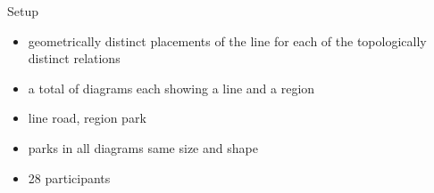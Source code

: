 \begin{frame}{Setup}
	\begin{itemize}
		\item {} geometrically distinct placements of the line for each of the  topologically distinct relations %
		
		\item a total of  diagrams each showing a line and a region
		
		\item line \Highlight{$\rightarrow$} road, region \Highlight{$\rightarrow$} park
		
		\item parks in all diagrams same size and shape
		
		\item 28 participants
	\end{itemize}
\end{frame}

